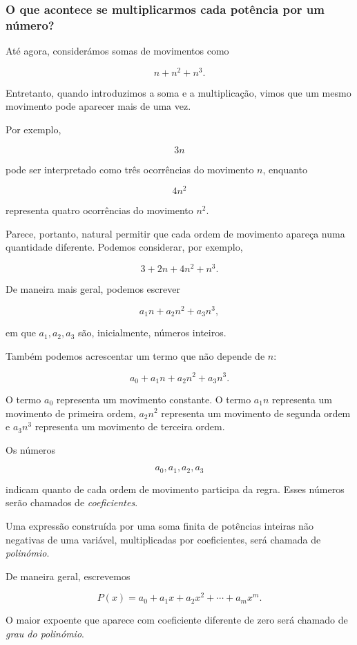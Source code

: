 \documentclass[12pt,a4paper]{article}
\begin{document}
\subsubsection{O que acontece se multiplicarmos cada potência por um número?}

Até agora, considerámos somas de movimentos como

\[
n+n^2+n^3.
\]

Entretanto, quando introduzimos a soma e a multiplicação, vimos que um
mesmo movimento pode aparecer mais de uma vez.

Por exemplo,

\[
3n
\]

pode ser interpretado como três ocorrências do movimento \(n\), enquanto

\[
4n^2
\]

representa quatro ocorrências do movimento \(n^2\).

Parece, portanto, natural permitir que cada ordem de movimento apareça
numa quantidade diferente. Podemos considerar, por exemplo,

\[
3+2n+4n^2+n^3.
\]

De maneira mais geral, podemos escrever

\[
a_1n+a_2n^2+a_3n^3,
\]

em que \(a_1,a_2,a_3\) são, inicialmente, números inteiros.

Também podemos acrescentar um termo que não depende de \(n\):

\[
a_0+a_1n+a_2n^2+a_3n^3.
\]

O termo \(a_0\) representa um movimento constante. O termo \(a_1n\)
representa um movimento de primeira ordem, \(a_2n^2\) representa um
movimento de segunda ordem e \(a_3n^3\) representa um movimento de
terceira ordem.

Os números

\[
a_0,a_1,a_2,a_3
\]

indicam quanto de cada ordem de movimento participa da regra. Esses
números serão chamados de \emph{coeficientes}.

Uma expressão construída por uma soma finita de potências inteiras não
negativas de uma variável, multiplicadas por coeficientes, será chamada
de \emph{polinómio}.

De maneira geral, escrevemos

\[
P(x)
=
a_0+a_1x+a_2x^2+\cdots+a_mx^m.
\]

O maior expoente que aparece com coeficiente diferente de zero será
chamado de \emph{grau do polinómio}.
\end{document}
